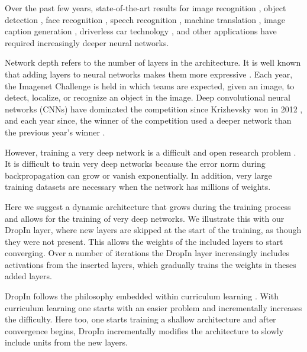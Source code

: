 \documentclass[10pt,twocolumn,letterpaper]{article}
\newcommand{\SotA}{state-of-the-art }
\newcommand{\dropin}{DropIn }
\begin{document}
\label{sec:intro}

Over the past few years, \SotA results for image recognition \cite{Alexnet12,  simonyan2014very,szegedy2014going}, object detection \cite{girshick2014rich}, face recognition \cite{taigman2014deepface}, speech recognition \cite{graves2014towards}, machine translation \cite{sutskever2014sequence}, image caption generation \cite{vinyals2014show}, driverless car technology \cite{huval2015empirical}, and other applications \cite{lecun2015deep} have required increasingly deeper neural networks. 


Network depth refers to the number of layers in the architecture. 
It is well known that adding layers to neural networks makes them more expressive \cite{montufar2014number}. 
Each year, the Imagenet Challenge \cite{Imagenet15} is held in which teams are expected, given an image, to detect, localize, or recognize an object in the image. 
Deep convolutional neural networks (CNNs) have dominated the competition since Krizhevsky \etal won in 2012 \cite{Alexnet12}, and each year since, the winner of the competition used a deeper network than the previous year's winner \cite{Imagenet15, simonyan2014very, szegedy2014going}.

However, training a very deep network is a difficult and open research problem \cite{erhan2009difficulty, glorot2010understanding, srivastava2015training}. 
It is difficult to train very deep networks because the error norm during backpropagation can grow or vanish exponentially.
In addition, very large training datasets are necessary when the network has millions of weights.

Here we suggest a dynamic architecture that grows during the training process and allows for the training of very deep networks.
We illustrate this with our \dropin layer, where new layers are skipped at the start of the training, as though they were not present.
This allows the weights of the included layers to start converging.
Over a number of iterations the \dropin layer increasingly includes activations from the inserted layers, which gradually trains the weights in theses added layers. 

\dropin follows the philosophy embedded within curriculum learning \cite{bengio2009curriculum}.
With curriculum learning one starts with an easier problem and incrementally increases the difficulty.
Here too, one starts training a shallow architecture and after convergence begins, \dropin incrementally modifies the architecture to slowly include units from the new layers.
\end{document}
